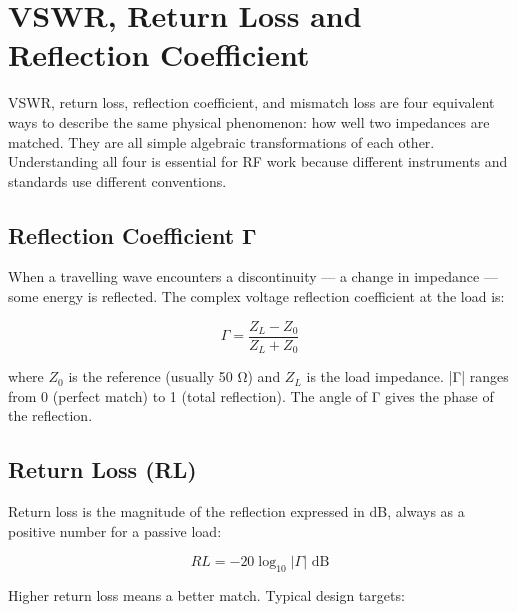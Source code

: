 \section{VSWR, Return Loss and Reflection Coefficient}\label{sec:wiki_vswr}



VSWR, return loss, reflection coefficient, and mismatch loss are four equivalent ways to describe the same physical phenomenon: how well two impedances are matched. They are all simple algebraic transformations of each other. Understanding all four is essential for RF work because different instruments and standards use different conventions.

      

\subsection{Reflection Coefficient Γ}

      

When a travelling wave encounters a discontinuity — a change in impedance — some energy is reflected. The complex voltage reflection coefficient at the load is:

      
\[\Gamma = \dfrac{Z_L - Z_0}{Z_L + Z_0}\]

      

where $Z_0$ is the reference (usually 50 Ω) and $Z_L$ is the load impedance. |Γ| ranges from 0 (perfect match) to 1 (total reflection). The angle of Γ gives the phase of the reflection.

      

\subsection{Return Loss (RL)}

      

Return loss is the magnitude of the reflection expressed in dB, always as a positive number for a passive load:


      
\[RL = -20\log_{10}|\Gamma|\text{ dB}\]

      

Higher return loss means a better match. Typical design targets:

      
        
        
        
